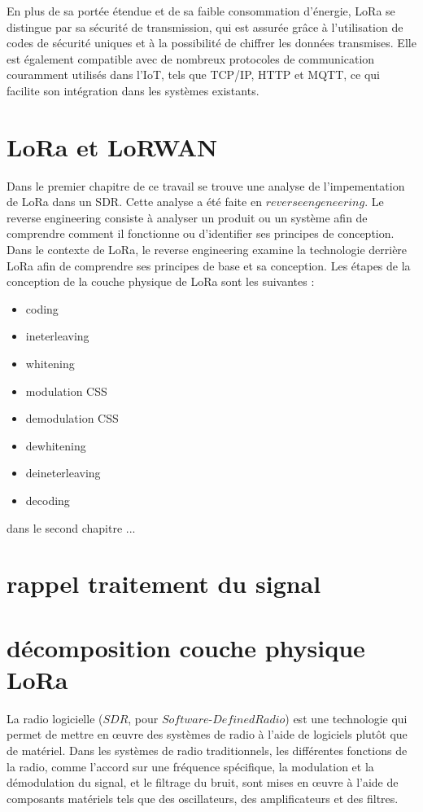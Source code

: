 \documentclass[12pt,a4paper,oneside, titlepage]{report}
\begin{document}
En plus de sa portée étendue et de sa faible consommation d'énergie, LoRa se distingue par sa sécurité de transmission, qui est assurée grâce à l'utilisation de codes de sécurité uniques et à la possibilité de chiffrer les données transmises. Elle est également compatible avec de nombreux protocoles de communication couramment utilisés dans l'IoT, tels que TCP/IP, HTTP et MQTT, ce qui facilite son intégration dans les systèmes existants.

\chapter{LoRa et LoRWAN}

Dans le premier chapitre de ce travail se trouve une analyse de l'impementation de LoRa dans un SDR. Cette analyse a été faite en $reverse engeneering$. Le reverse engineering consiste à analyser un produit ou un système afin de comprendre comment il fonctionne ou d'identifier ses principes de conception. Dans le contexte de LoRa, le reverse engineering examine la technologie derrière LoRa afin de comprendre ses principes de base et sa conception. Les étapes de la conception de la couche physique de LoRa sont les suivantes :
\begin{itemize}
\item coding
\item ineterleaving
\item whitening
\item modulation CSS
\item demodulation CSS
\item dewhitening
\item deineterleaving
\item decoding
\end{itemize} 

dans le second chapitre ... 


\newpage

\chapter{rappel traitement du signal}


\chapter{décomposition couche physique LoRa}\label{ch:1}
\renewcommand{\leftmark}{CHAPITRE \thechapter.~~Physical LoRa}

La radio logicielle ($SDR$, pour $Software$-$Defined Radio$) est une technologie qui permet de mettre en œuvre des systèmes de radio à l'aide de logiciels plutôt que de matériel. Dans les systèmes de radio traditionnels, les différentes fonctions de la radio, comme l'accord sur une fréquence spécifique, la modulation et la démodulation du signal, et le filtrage du bruit, sont mises en œuvre à l'aide de composants matériels tels que des oscillateurs, des amplificateurs et des filtres.
\end{document}
